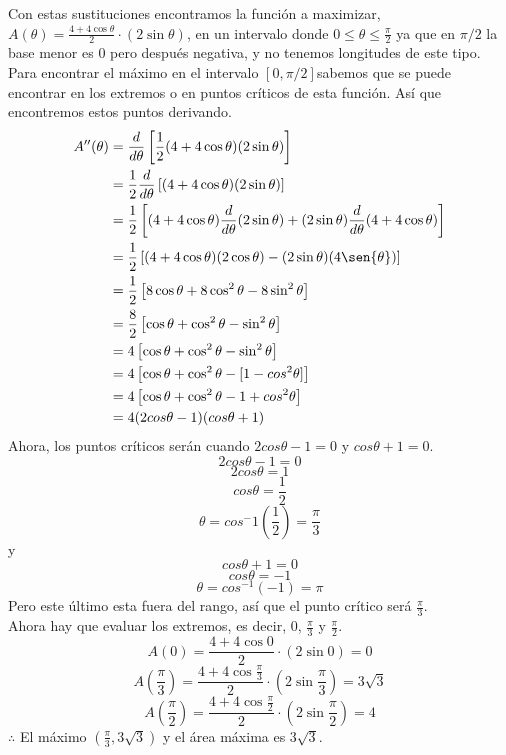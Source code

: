 \documentclass[12pt]{article}
\begin{document}
Con estas sustituciones encontramos la función a maximizar, $A(\theta) = \frac{4+4\cos{\theta}}{2}\cdot( 2\sin{\theta}) $, en un intervalo donde $0 \leq \theta \leq \frac{\pi}{2}$ ya que en $\pi/2$ la base menor es 0 pero después negativa, y no tenemos longitudes de este tipo.
Para encontrar el máximo en el intervalo $[0,\pi /2 ]$sabemos que se puede encontrar en los extremos o en puntos críticos de esta función. Así que encontremos estos puntos derivando.
\begin{align*}
  A''(\theta)
  &= \frac{d}{d\theta} \left[  \frac{1}{2}(4+4\cos{\theta})( 2\sin{\theta}) \right]\\
  &= \frac{1}{2}  \frac{d}{d\theta}  \left[ (4+4\cos{\theta})( 2\sin{\theta}) \right]\\
  &= \frac{1}{2}   \left[ (4+4\cos{\theta}) \frac{d}{d\theta}  ( 2\sin{\theta}) + ( 2\sin{\theta}) \frac{d}{d\theta}  (4+4\cos{\theta})  \right]\\
  &= \frac{1}{2}   \left[ (4+4\cos{\theta}) ( 2\cos{\theta}) - ( 2\sin{\theta})  (4\sen{\theta})  \right]\\
  &= \frac{1}{2}   \left[  8\cos{\theta} + 8\cos^{2}\theta   - 8\sin^{2}\theta   \right] \\
  &= \frac{8}{2}   \left[  \cos{\theta} + \cos^{2}\theta   - \sin^{2}\theta   \right] \\
  &= 4   \left[  \cos{\theta} + \cos^{2}\theta   - \sin^{2}\theta   \right] \\
  &= 4   \left[  \cos{\theta} + \cos^{2}\theta   -  [1-cos^{2}\theta]   \right] \\
  &= 4   \left[  \cos{\theta} + \cos^{2}\theta   - 1 + cos^{2}\theta   \right] \\
  &= 4   (2cos\theta-1)(cos\theta+1) \\ 
\end{align*}
Ahora, los puntos críticos serán cuando $2cos\theta-1=0$ y $cos\theta+1=0$.
\[
2cos\theta-1=0 
\]
\[
2cos\theta=1 
\]
\[
cos\theta=\frac{1}{2} 
\]
\[
\theta=cos^-1 \left(\frac{1}{2}  \right) = \frac{\pi}{3}
\]
y
\[
cos\theta+1 =0
\]
\[
cos\theta =-1
\]
\[
\theta =cos^{-1}(-1) = \pi
\]
Pero este último esta fuera del rango, así que el punto crítico será $\frac{\pi}{3}$.\\
Ahora hay que evaluar los extremos, es decir, $0$,  $\frac{\pi}{3}$ y $\frac{\pi}{2}$.\\
\[
A(0)= \frac{4+4\cos{0}}{2}\cdot( 2\sin{0}) = 0
\]
\[
A(\frac{\pi}{3})= \frac{4+4\cos{\frac{\pi}{3}}}{2}\cdot( 2\sin{\frac{\pi}{3}})= 3 \sqrt{3}
\]
\[
A(\frac{\pi}{2})= \frac{4+4\cos{\frac{\pi}{2}}}{2}\cdot( 2\sin{\frac{\pi}{2}}) = 4
\]
$\therefore$ El máximo $(\frac{\pi}{3}, 3 \sqrt{3} )$ y el área máxima es $3 \sqrt{3}$.
\end{document}
